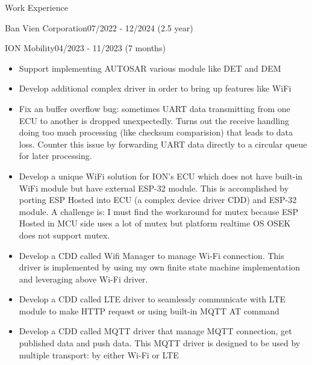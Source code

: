 \documentclass{resume} %
\begin{document}
\begin{rSection}{Work Experience}
\begin{rCompanySubsection}{Ban Vien Corporation}{07/2022 - 12/2024 (2.5 year)}
        \begin{rProjectSubsubsectionV2}{ION Mobility}{04/2023 - 11/2023 (7 months)}{
            \begin{itemize}
                \item Support implementing AUTOSAR various module like DET and DEM
                \item Develop additional complex driver in order to bring up features like WiFi
            \end{itemize}
        }{
            \begin{itemize}
                \item Fix an buffer overflow bug: sometimes UART data transmitting from one ECU to another is dropped unexpectedly. Turns out the receive handling doing too much processing (like checksum comparision) that leads to data loss. Counter this issue by forwarding UART data directly to a circular queue for later processing.
                \item Develop a unique WiFi solution for ION's ECU which does not have built-in WiFi module but have external ESP-32 module. This is accomplished by porting ESP Hosted into ECU (a complex device driver CDD) and ESP-32 module. A challenge is: I must find the workaround for mutex because ESP Hosted in MCU side uses a lot of mutex but platform realtime OS OSEK does not support mutex.
                \item Develop a CDD called Wifi Manager to manage Wi-Fi connection. This driver is implemented by using my own finite state machine implementation and leveraging above Wi-Fi driver.
                \item Develop a CDD called LTE driver to seamlessly communicate with LTE module to make HTTP request or using built-in MQTT AT command
                \item Develop a CDD called MQTT driver that manage MQTT connection, get published data and push data. This MQTT driver is designed to be used by multiple transport: by either Wi-Fi or LTE
            \end{itemize}
        }
        \end{rProjectSubsubsectionV2}


\end{rCompanySubsection}
\end{rSection}
\end{document}
